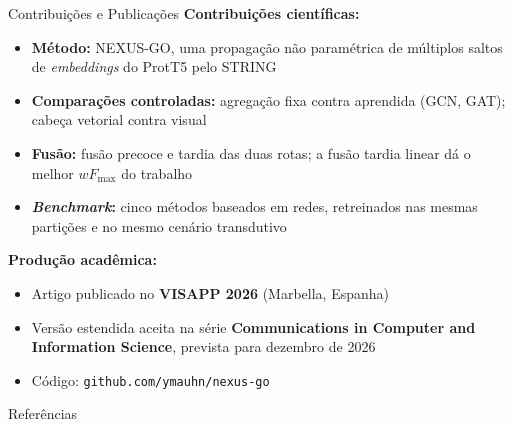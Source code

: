 \documentclass[aspectratio=169,11pt]{beamer}
\newcommand{\wF}{wF_{\max}}
\begin{document}
\begin{frame}{Contribuições e Publicações}
  \textbf{Contribuições científicas:}
  \begin{itemize}\setlength{\itemsep}{0.15em}\small
    \item \textbf{Método:} NEXUS-GO, uma propagação não paramétrica de múltiplos saltos de \textit{embeddings} do ProtT5 pelo
      STRING
    \item \textbf{Comparações controladas:} agregação fixa contra aprendida (GCN, GAT); cabeça vetorial contra visual
    \item \textbf{Fusão:} fusão precoce e tardia das duas rotas; a fusão tardia linear dá o melhor $\wF$ do trabalho
    \item \textbf{\textit{Benchmark}:} cinco métodos baseados em redes, retreinados nas mesmas partições e no mesmo cenário
      transdutivo
  \end{itemize}
  \vspace{0.3em}
  \textbf{Produção acadêmica:}
  \begin{itemize}\setlength{\itemsep}{0.15em}\small
    \item Artigo publicado no \textbf{VISAPP 2026} (Marbella, Espanha)~\cite{mauhnoom2026graphs}
    \item Versão estendida aceita na série \textbf{Communications in Computer and Information Science}, prevista para
      dezembro de 2026~\cite{mauhnoom2026beyond}
    \item Código: \texttt{github.com/ymauhn/nexus-go}
  \end{itemize}
\end{frame}

\begin{frame}[allowframebreaks]{Referências}
  \scriptsize
  \begin{otherlanguage}{english}
  
  
  \end{otherlanguage}
\end{frame}
\end{document}
